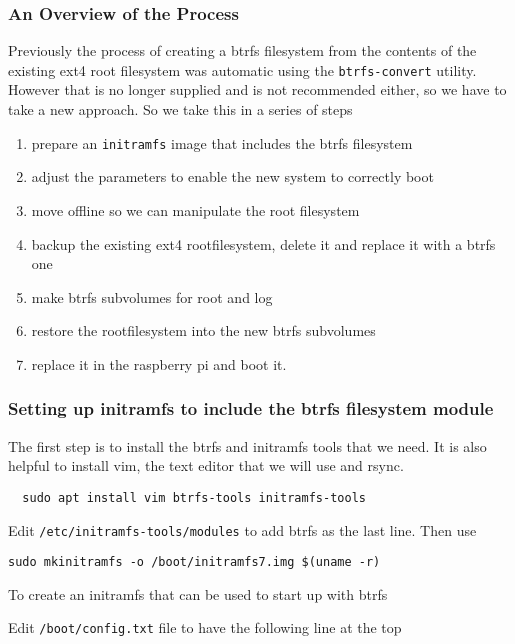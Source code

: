 \documentclass[Draft]{akc}
\begin{document}
\subsubsection{An Overview of the Process}
Previously the process of creating a btrfs filesystem from the contents of the existing ext4 root filesystem was
automatic using the \texttt{btrfs-convert} utility.  However that is no longer supplied and is not recommended either,
so we have to take a new approach.  So we take this in a series of steps
\begin{enumerate}
  \item prepare an \texttt{initramfs} image that includes the btrfs filesystem
  \item adjust the parameters to enable the new system to correctly boot
  \item move offline so we can manipulate the root filesystem
  \item backup the existing ext4 rootfilesystem, delete it and replace it with a btrfs one
  \item make btrfs subvolumes for root and log
  \item restore the rootfilesystem into the new btrfs subvolumes
  \item replace it in the raspberry pi and boot it.
\end{enumerate}

\subsubsection{Setting up initramfs to include the btrfs filesystem module}

The first step is to install the btrfs and initramfs tools that we need. It is also helpful to
install vim, the text editor that we will use and rsync.

\begin{lstlisting}
  sudo apt install vim btrfs-tools initramfs-tools
\end{lstlisting}

Edit \texttt{/etc/initramfs-tools/modules} to add btrfs as the last line. Then use

\begin{lstlisting}
sudo mkinitramfs -o /boot/initramfs7.img $(uname -r)
\end{lstlisting}

To create an initramfs that can be used to start up with btrfs

Edit \texttt{/boot/config.txt} file to have the following line at the top
\end{document}
